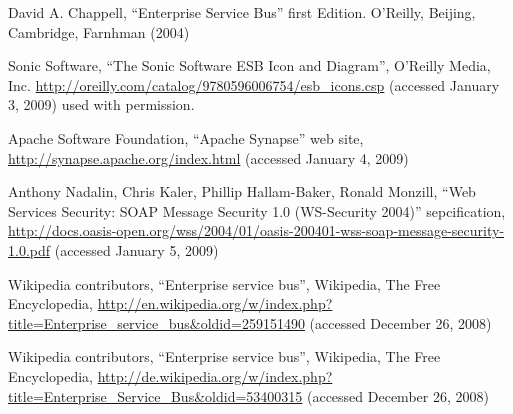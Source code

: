 %
%

\begin{thebibliography}{}

 David A. Chappell,
``Enterprise Service Bus'' first Edition. 
O'Reilly, Beijing, Cambridge, Farnhman (2004)

Sonic Software,
``The Sonic Software ESB Icon and Diagram'',
O'Reilly Media, Inc.
\url{http://oreilly.com/catalog/9780596006754/esb_icons.csp} (accessed January
3, 2009)
used with permission.

Apache Software Foundation, 
``Apache Synapse'' web site,
\url{http://synapse.apache.org/index.html} (accessed January 4, 2009)

Anthony Nadalin, Chris Kaler, Phillip Hallam-Baker, Ronald Monzill,
``Web Services Security: SOAP Message Security 1.0 (WS-Security 2004)''
sepcification,
\url{http://docs.oasis-open.org/wss/2004/01/oasis-200401-wss-soap-message-security-1.0.pdf}
(accessed January 5, 2009)

Wikipedia contributors,
``Enterprise service bus'', Wikipedia, The Free
Encyclopedia,
\url{http://en.wikipedia.org/w/index.php?title=Enterprise_service_bus&oldid=259151490}
(accessed December 26, 2008)

Wikipedia contributors,
``Enterprise service bus'',
Wikipedia, The Free Encyclopedia,
\url{http://de.wikipedia.org/w/index.php?title=Enterprise_Service_Bus&oldid=53400315}
(accessed December 26, 2008)

\end{thebibliography}
